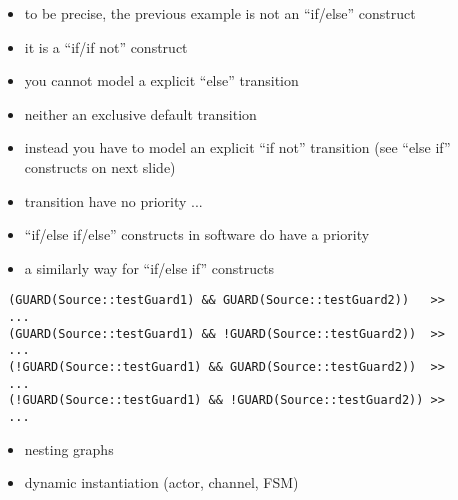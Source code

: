 \begin{frame}[fragile=singleslide]
\begin{itemize}
\item to be precise, the previous example is not an ``if/else'' construct
\item it is a ``if/if not'' construct
\item you cannot model a explicit ``else'' transition
\item neither an exclusive default transition
\item instead you have to model an explicit ``if not'' transition (see ``else if'' constructs on next slide)
\item transition have no priority ...
\item ``if/else if/else'' constructs in software do have a priority
\end{itemize}
\end{frame}





\begin{frame}[fragile=singleslide]
\begin{itemize}
\item a similarly way for ``if/else if'' constructs
\end{itemize}
\begin{lstlisting}
 (GUARD(Source::testGuard1) && GUARD(Source::testGuard2))   >>
 ...
 (GUARD(Source::testGuard1) && !GUARD(Source::testGuard2))  >>
 ...
 (!GUARD(Source::testGuard1) && GUARD(Source::testGuard2))  >>
 ...
 (!GUARD(Source::testGuard1) && !GUARD(Source::testGuard2)) >>
 ...
\end{lstlisting}
\end{frame}









\begin{frame}
\begin{itemize}
\item nesting graphs
\item dynamic instantiation (actor, channel, FSM)

\end{itemize}
\end{frame}



